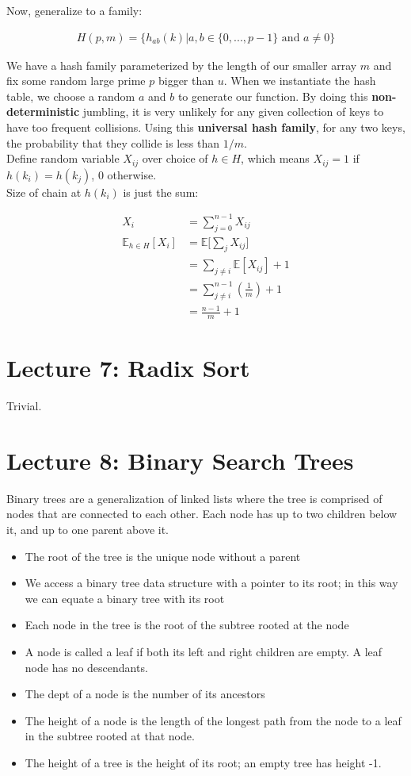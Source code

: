 \documentclass[11pt]{article}
\begin{document}
Now, generalize to a family:

\begin{align*}
    H(p,m)=\{h_{ab}(k) | a,b \in \{0,...,p-1\} \text{ and } a \neq 0 \}
\end{align*}

We have a hash family parameterized by the length of our smaller array $m$ and fix some random 
large prime $p$ bigger than $u$. When we instantiate the hash table, we choose a random $a$ and 
$b$ to generate our function. By doing this \textbf{non-deterministic} jumbling, it is very 
unlikely for any given collection of keys to have too frequent collisions. Using this 
\textbf{universal hash family}, for any two keys, the probability that they collide is less than 
$1/m$. \\
Define random variable $X_{ij}$ over choice of $h \in H$, which means $X_{ij}=1$ if 
$h(k_i)=h(k_j)$, $0$ otherwise. \\
Size of chain at $h(k_i)$ is just the sum:

\begin{align*}
    X_i&=\sum_{j=0}^{n-1}X_{ij} \\
    \mathbb{E}_{h \in H} [X_i]&=\mathbb{E}\Bigg[\sum_{j}X_{ij}\Bigg] \\
    &=\sum_{j\neq i}\mathbb{E}[X_{ij}]+1 \\
    &= \sum_{j\neq i}^{n-1}(\frac{1}{m})+1 \\
    &= \frac{n-1}{m} + 1
\end{align*}

\section{Lecture 7: Radix Sort}
Trivial.

\section{Lecture 8: Binary Search Trees}
Binary trees are a generalization of linked lists where the tree is comprised of nodes that are 
connected to each other. Each node has up to two children below it, and up to one parent above it.

\begin{itemize}
    \item The root of the tree is the unique node without a parent
    \item We access a binary tree data structure with a pointer to its root; in this way we can
        equate a binary tree with its root
    \item Each node in the tree is the root of the subtree rooted at the node
    \item A node is called a leaf if both its left and right children are empty. A leaf node
        has no descendants.
    \item The dept of a node is the number of its ancestors
    \item The height of a node is the length of the longest path from the node to a leaf in the
        subtree rooted at that node.
    \item The height of a tree is the height of its root; an empty tree has height -1.
\end{itemize}
\end{document}
